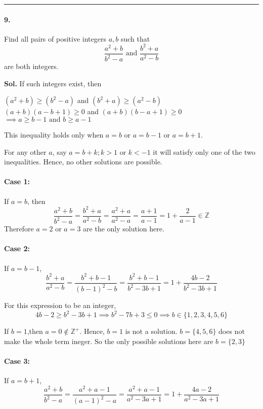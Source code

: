 \documentclass[12pt]{amsart}
\begin{document}
\par\noindent\textcolor{gray}{\rule{\textwidth}{0.5pt}}
\smallskip

\paragraph*{9.} Find all pairs of positive integers $ a, b $ such that
$$ \frac{a^2+b}{b^2-a} \text{ and } \frac{b^2+a}{a^2-b} $$ are both integers.

\bigskip
\textbf{Sol.}
If such integers exist, then
\begin{center}
    $(a^2+b)\ge(b^2-a)$ and $(b^2+a) \ge (a^2-b)$ \\
    $(a+b)(a-b+1) \ge0$ and $(a+b)(b-a+1) \ge0$ \\
    $\implies \boxed{a \ge b-1 \text{ and } b \ge a-1}$
\end{center}
This inequality holds only when $a=b$ 
or $a=b-1$ or $a=b+1$.

For any other $a$, say $a = b+k; k > 1 \text { or } k < -1  $ it will satisfy only one of the two inequalities. Hence, no other solutions are possible.
\paragraph*{\textbf{Case 1:}} If $a=b$, then 
$$\frac{a^2+b}{b^2-a} =\frac{b^2+a}{a^2-b} = \frac{a^2+a}{a^2-a} = \frac{a+1}{a-1} = 1+ \frac{2}{a-1} \in \mathbb{Z}$$
Therefore $a=2$ or $a=3$ are the only solution here.

\paragraph*{\textbf{Case 2:}} If $a=b-1$,
$$\frac{b^2+a}{a^2-b} = \frac{b^2+b-1}{(b-1)^2-b}=\frac{b^2+b-1}{b^2-3b+1}=1+ \frac{4b-2}{b^2-3b+1}$$

For this expression to be an integer,
$$
4b-2 \ge b^2-3b+1 \implies
b^2-7b+3 \le 0 \implies
b \in \{1,2,3,4,5,6\} 
$$

If $b = 1$,then $a=0 \notin \mathbb{Z}^+$. Hence, $b=1$ is not a solution.
$b = \{4,5,6\}$ does not make the whole term ineger.
So the only possible solutions here are $b=\{2, 3\}$

\paragraph*{\textbf{Case 3:}} If $a=b+1$,
$$\frac{a^2+b}{b^2-a} = \frac{a^2+a-1}{(a-1)^2-a}=\frac{a^2+a-1}{a^2-3a+1}=1+ \frac{4a-2}{a^2-3a+1}$$
\end{document}
